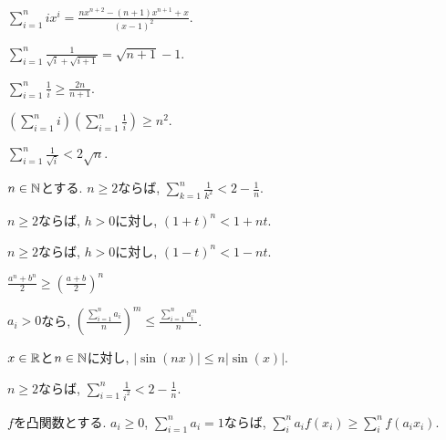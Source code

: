 \begin{prop}
  $\sum_{i=1}^n ix^i=\frac{nx^{n+2}-(n+1)x^{n+1}+x}{(x-1)^2}$.
\end{prop}

\begin{prop}
  $\sum_{i=1}^n \frac{1}{\sqrt{i}+\sqrt{i+1}}=\sqrt{n+1}-1$.
\end{prop}

\begin{prop}
$\sum_{i=1}^{n}\frac{1}{i}\geq \frac{2n}{n+1}$.
\end{prop}

\begin{prop}
$\left(\sum_{i=1}^{n}i\right)\left(\sum_{i=1}^{n}\frac{1}{i}\right)\geq n^2$.
\end{prop}

\begin{prop}
$\sum_{i=1}^{n}\frac{1}{\sqrt{i}}<2\sqrt{n}$.
\end{prop}

\begin{prop}
$n\in\mathbb{N}$とする.
  $n\geq 2$ならば, $\sum_{k=1}^n\frac{1}{k^2} < 2-\frac{1}{n}$.
\end{prop}

\begin{prop}
  $n\geq 2$ならば,  $h>0$に対し,
$(1+t)^n<1+nt$.
\end{prop}
\begin{prop}
  $n\geq 2$ならば,  $h>0$に対し,
$(1-t)^n<1-nt$.
\end{prop}

\begin{prop}
$\frac{a^n+b^n}{2}\geq \left(\frac{a+b}{2}\right)^n$
\end{prop}

\begin{prop}
  $a_i>0$なら,
  $\left(\frac{\sum_{i=1}^n a_i}{n}\right)^m \leq \frac{\sum_{i=1}^{n}a_i^m}{n}$.
\end{prop}

\begin{prop}
$x\in\mathbb{R}$と$n\in\mathbb{N}$に対し, $|\sin(nx)|\leq n|\sin(x)|$.
\end{prop}

\begin{prop}
  $n\geq 2$ならば,
  $\sum_{i=1}^{n}\frac{1}{i^2}<2-\frac{1}{n}$.
\end{prop}

\begin{prop}
  $f$を凸関数とする.
  $a_i\geq 0$, $\sum_{i=1}^n a_i=1$ならば,
  $\sum_{i}^{n} a_i f(x_i)\geq \sum_{i}^{n}  f(a_i x_i)$.
\end{prop}


